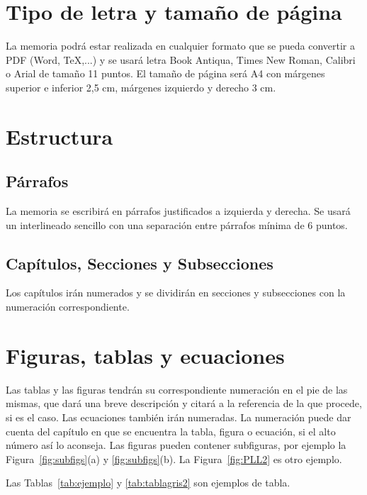 \section{Tipo de letra y tamaño de página}
\noindent La memoria podrá estar realizada en cualquier formato que se pueda convertir a PDF (Word, \TeX,...) y se usará letra Book Antiqua, Times New Roman, Calibri o Arial de tamaño 11 puntos. El tamaño de página será A4 con márgenes superior e inferior 2,5 cm, márgenes izquierdo y derecho 3 cm.
\section{Estructura}
\subsection{Párrafos}
\noindent La memoria se escribirá en párrafos justificados a izquierda y derecha. Se usará un interlineado sencillo con una separación entre párrafos mínima de 6 puntos.
\subsection{Capítulos, Secciones y Subsecciones}
\noindent Los capítulos irán numerados y se dividirán en secciones y subsecciones con la numeración correspondiente.  
\section{Figuras, tablas y ecuaciones}
\noindent Las tablas y las figuras tendrán su correspondiente numeración en el pie de las mismas, que dará una breve descripción y citará a la referencia de la que procede, si es el caso. Las ecuaciones también irán numeradas. La numeración puede dar cuenta del capítulo en que se encuentra la tabla, figura o ecuación, si el alto número así lo aconseja. Las figuras pueden contener subfiguras, por ejemplo la Figura~\mbox{\ref{fig:subfigs}(a)} y \mbox{\ref{fig:subfigs}(b)}. La Figura~\ref{fig:PLL2} es otro ejemplo.

Las Tablas~\ref{tab:ejemplo} y \ref{tab:tablagris2} son ejemplos de tabla.

